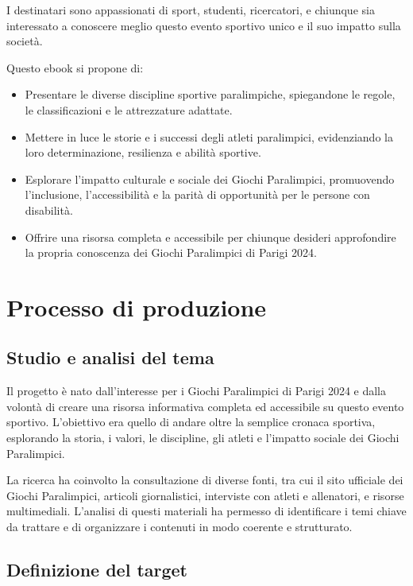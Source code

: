 \documentclass[a4paper,12pt]{report}
\begin{document}
I destinatari sono appassionati di sport, studenti, ricercatori, e chiunque sia interessato a conoscere meglio questo evento sportivo unico e il suo impatto sulla società.

Questo ebook si propone di:

\begin{itemize}
    \item Presentare le diverse discipline sportive paralimpiche, spiegandone le regole, le classificazioni e le attrezzature adattate.
    \item Mettere in luce le storie e i successi degli atleti paralimpici, evidenziando la loro determinazione, resilienza e abilità sportive.
    \item Esplorare l'impatto culturale e sociale dei Giochi Paralimpici, promuovendo l'inclusione, l'accessibilità e la parità di opportunità per le persone con disabilità.
    \item Offrire una risorsa completa e accessibile per chiunque desideri approfondire la propria conoscenza dei Giochi Paralimpici di Parigi 2024.
\end{itemize}

\section{Processo di produzione}

\subsection{Studio e analisi del tema}

Il progetto è nato dall'interesse per i Giochi Paralimpici di Parigi 2024 e dalla volontà di creare una risorsa informativa completa ed accessibile su questo evento sportivo. L'obiettivo era quello di andare oltre la semplice cronaca sportiva, esplorando la storia, i valori, le discipline, gli atleti e l'impatto sociale dei Giochi Paralimpici.

La ricerca ha coinvolto la consultazione di diverse fonti, tra cui il sito ufficiale dei Giochi Paralimpici, articoli giornalistici, interviste con atleti e allenatori, e risorse multimediali. L'analisi di questi materiali ha permesso di identificare i temi chiave da trattare e di organizzare i contenuti in modo coerente e strutturato.

\subsection{Definizione del target}
\end{document}
